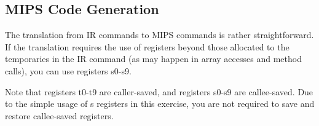 \documentclass{article}
\begin{document}
\subsection{MIPS Code Generation}

The translation from IR commands to MIPS commands is rather straightforward.
If the translation requires the use of registers beyond those allocated to the temporaries in the IR command (as may happen in array accesses and method calls), you can use registers s0-s9.

Note that registers t0-t9 are caller-saved, and registers s0-s9 are callee-saved. Due to the simple usage of s registers in this exercise, you are not required to save and restore callee-saved registers. 
\end{document}
